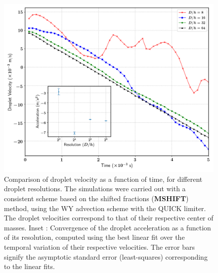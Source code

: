 \begin{figure}
\begin{center}
\includegraphics[width = 1.0\textwidth]{plots/raindrop/dropl_velocity_accel_ppd.png}
\end{center}
\vspace*{-0.5cm}
\caption{Comparison of droplet velocity as a function of time, for different droplet resolutions.
	The simulations were carried out with a consistent scheme based on the 
	shifted fractions (\textbf{MSHIFT}) method, using the WY advection scheme with the QUICK limiter. 
	The droplet velocities correspond to that of their respective center of masses. 
	Inset : Convergence of the droplet acceleration as a function of its resolution, 
	computed using the best linear fit over the temporal variation of their respective velocities. 
	The error bars signify the asymptotic standard error (least-squares) corresponding to the linear fits.} 
\label{drop_vel_caf}
\end{figure}

